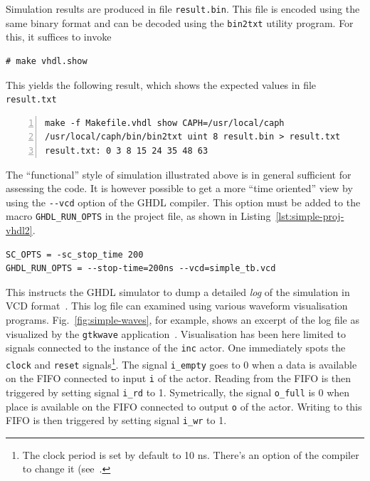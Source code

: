 Simulation results are produced in file \verb|result.bin|. This file is encoded using the same
binary format and can be decoded using the \verb|bin2txt| utility program. For this, it suffices to
invoke 

\begin{lstlisting}[style=BashInputStyle]
# make vhdl.show
\end{lstlisting}

This yields the following result, which shows the expected values in file \texttt{result.txt}

\begin{lstlisting}[style=BashOutputStyle,numbers=left,numberstyle=\tiny]
make -f Makefile.vhdl show CAPH=/usr/local/caph
/usr/local/caph/bin/bin2txt uint 8 result.bin > result.txt
result.txt: 0 3 8 15 24 35 48 63 
\end{lstlisting}

\medskip
The ``functional'' style of simulation illustrated above is in general sufficient for assessing the
code. It is however possible to get a more ``time oriented'' view by using the \verb|--vcd| option
of the GHDL compiler. This option must be added to the macro \verb|GHDL_RUN_OPTS| in the project
file, as shown in Listing~\ref{lst:simple-proj-vhdl2}.

\begin{lstlisting}[style=MakeStyle,caption={File
    \texttt{simple.proj} for compiling and running SystemC and VHDL code (2nd
    version)},label={lst:simple-proj-vhdl2}]
SC_OPTS = -sc_stop_time 200
GHDL_RUN_OPTS = --stop-time=200ns --vcd=simple_tb.vcd
\end{lstlisting}

This instructs the GHDL simulator to dump a detailed \emph{log} of the simulation in VCD
format~\cite{VCD}. This log file can examined using various waveform visualisation
programs. Fig.~\ref{fig:simple-waves}, for example, shows an excerpt of the log file as visualized
by the \verb|gtkwave| application~\cite{gtkwave}. Visualisation has been here limited to signals
connected to the instance of the \verb|inc| actor. One immediately spots the \verb|clock| and
\verb|reset| signals\footnote{The clock period is set by default to 10 ns. There's an option of the
  compiler to change it (see~\cite{caph-lrm}.}.  The signal \verb|i_empty| goes to 0 when a data is
available on the FIFO connected to input \verb|i| of the actor. Reading from the FIFO is then
triggered by setting signal \verb|i_rd| to 1. Symetrically, the signal \verb|o_full| is 0 when place
is available on the FIFO connected to output \verb|o| of the actor. Writing to this FIFO is then
triggered by setting signal \verb|i_wr| to 1.

